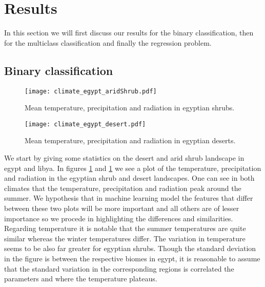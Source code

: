 \section{Results}

In this section we will first discuss our results for the binary classification, then for the multiclass classification
and finally the regression problem.

\subsection{Binary classification}


\begin{figure}[h]
  \centering
  \begin{minipage}{0.45\textwidth}
    \centering
    \texttt{[image: climate\_egypt\_aridShrub.pdf]}
    \caption{Mean temperature, precipitation and radiation in egyptian shrubs.}
    \label{pl:climate:egypt:aridShrub}
  \end{minipage}
  \hfill
  \begin{minipage}{0.45\textwidth}
    \centering
    \texttt{[image: climate\_egypt\_desert.pdf]}
    \caption{Mean temperature, precipitation and radiation in egyptian deserts.}
    \label{pl:climate:egypt:aridShrub}
  \end{minipage}
\end{figure}
We start by giving some statistics on the desert and arid shrub landscape in egypt and libya.
In figures \ref{pl:climate:egypt:aridShrub} and \ref{pl:climate:egypt:aridShrub}
we see a plot of the temperature, precipitation and radiation 
in the egyptian shrub and desert landscapes.
One can see in both climates that the temperature, precipitation and radiation peak around the summer.
We hypothesis that in machine learning model the features that differ between these two plots will be more important
and all others are of lesser importance so we procede in highlighting the differences and similarities.
Regarding temperature it is notable that the summer temperatures are quite similar whereas the winter temperatures differ.
The variation in temperature seems to be also far greater for egyptian shrubs.
Though the standard deviation in the figure is between the respective biomes in egypt, it is reasonable to assume that
the standard variation in the corresponding regions is correlated the parameters  and  where the
temperature plateaus.

